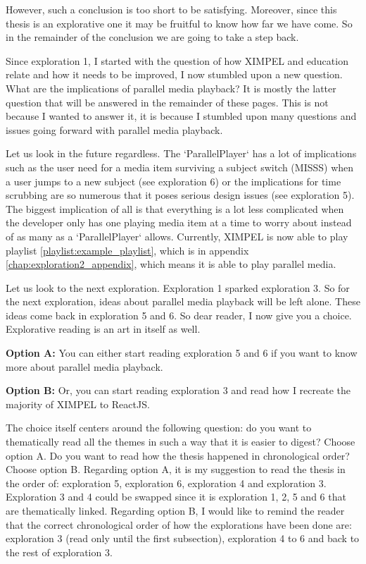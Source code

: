 However, such a conclusion is too short to be satisfying. Moreover, since this thesis is an explorative one it may be fruitful to know how far we have come. So in the remainder of the conclusion we are going to take a step back.

Since exploration 1, I started with the question of how XIMPEL and education relate and how it needs to be improved, I now stumbled upon a new question. What are the implications of parallel media playback? It is mostly the latter question that will be answered in the remainder of these pages. This is not because I wanted to answer it, it is because I stumbled upon many questions and issues going forward with parallel media playback. 

Let us look in the future regardless. The `ParallelPlayer` has a lot of implications such as the user need for a media item surviving a subject switch (MISSS) when a user jumps to a new subject (see exploration 6) or the implications for time scrubbing are so numerous that it poses serious design issues (see exploration 5). The biggest implication of all is that everything is a lot less complicated when the developer only has one playing media item at a time to worry about instead of as many as a `ParallelPlayer` allows. Currently, XIMPEL is now able to play playlist \ref{playlist:example_playlist}, which is in appendix \ref{chap:exploration2_appendix}, which means it is able to play parallel media.

Let us look to the next exploration. Exploration 1 sparked exploration 3. So for the next exploration, ideas about parallel media playback will be left alone. These ideas come back in exploration 5 and 6. So dear reader, I now give you a choice. Explorative reading is an art in itself as well.

\textbf{Option A:} You can either start reading exploration 5 and 6 if you want to know more about parallel media playback.

\textbf{Option B:} Or, you can start reading exploration 3 and read how I recreate the majority of XIMPEL to ReactJS.

The choice itself centers around the following question: do you want to thematically read all the themes in such a way that it is easier to digest? Choose option A. Do you want to read how the thesis happened in chronological order? Choose option B. Regarding option A, it is my suggestion to read the thesis in the order of: exploration 5, exploration 6, exploration 4 and exploration 3. Exploration 3 and 4 could be swapped since it is exploration 1, 2, 5 and 6 that are thematically linked. Regarding option B, I would like to remind the reader that the correct chronological order of how the explorations have been done are: exploration 3 (read only until the first subsection), exploration 4 to 6 and back to the rest of exploration 3. 

